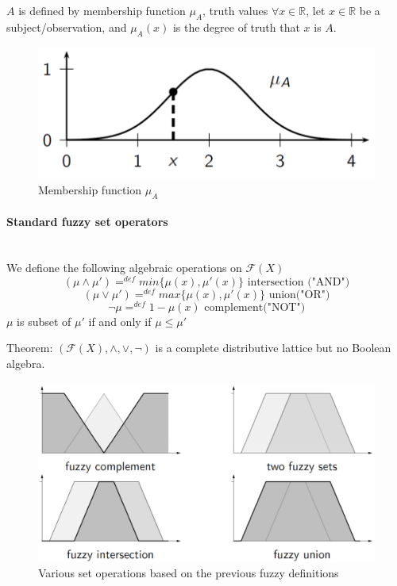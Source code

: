 \documentclass{article}
\begin{document}
$A$ is defined by membership function $\mu_A$, truth values $\forall x \in\mathbb{R}$, let
$x\in\mathbb{R}$ be a subject/observation, and $\mu_A(x)$ is the degree of truth that $x$
is $A$.

\begin{figure}[H]
    \centering
    \includegraphics[scale=0.5]{images/membership-func-fuzzy.png}
    \caption{Membership function $\mu_A$}
\end{figure}
\paragraph{Standard fuzzy set operators}\mbox{}\\
We defione the following algebraic operations on $\mathcal{F}(X)$
$$(\mu\land\mu')=^{def} min\{\mu(x),\mu'(x)\}\text{ intersection ("AND")}$$
$$(\mu\lor\mu')=^{def} max\{\mu(x),\mu'(x)\} \text{ union("OR")}$$
$$\lnot\mu =^{def} 1-\mu(x)\text{ complement("NOT")}$$
$\mu$ is subset of $\mu'$ if and only if $\mu\leq\mu'$

Theorem: $(\mathcal{F}(X),\land,\lor,\lnot)$ is a complete distributive lattice but no Boolean
algebra.
\begin{figure}[H]
    \centering
    \includegraphics[scale=0.3]{images/fuzzy-exa.png}
    \caption{Various set operations based on the previous fuzzy definitions}
\end{figure}
\end{document}
